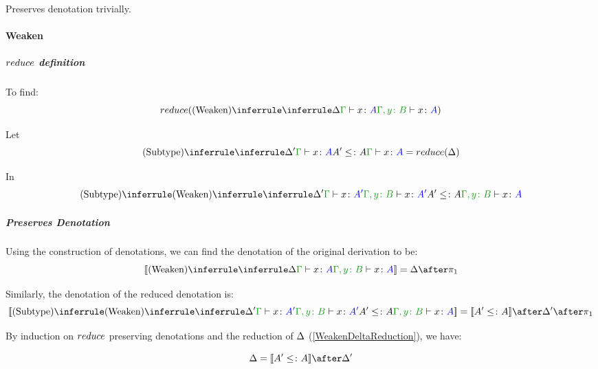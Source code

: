 \documentclass{report}
\begin{document}
        Preserves denotation trivially.

        \paragraph{Weaken}
        \subparagraph{$reduce$ definition}
        To find:
        \begin{equation}
            \reduce(\ntreeruleI{Weaken}{\treeruleI{\D}{\gtyperelation{x}{A}}}{\typerelation{\gby}{x}{A}})
        \end{equation}

        Let 
        \begin{equation}\label{WeakenDeltaReduction}
            \ntreeruleII{Subtype}{\treeruleI{\D'}{\gtyperelation{x}{A}}}{ A'\subtype A}{\gtyperelation{x}{A}} = \reduce(\D)
        \end{equation}

        In 
        \begin{equation}
            \ntreeruleII{Subtype}{
            \ntreeruleI{Weaken}{
                \treeruleI{\D'}{\gtyperelation{x}{A'}}
            } {
                \typerelation{\gby}{x}{A'}
            }
            }{
            A' \subtype A
            }{\typerelation{\gby}{x}{A}}
        \end{equation}

        \subparagraph{Preserves Denotation}
        Using the construction of denotations, we can find the denotation of the original derivation to be:
        \begin{equation}
            \deno{\ntreeruleI{Weaken}{\treeruleI{\D}{\gtyperelation{x}{A}}}{\typerelation{\gby}{x}{A}}} = \D \after \p
        \end{equation}

        Similarly, the denotation of the reduced denotation is:
        \begin{equation}
            \deno{\ntreeruleII{Subtype}{
                \ntreeruleI{Weaken}{
                    \treeruleI{\D'}{\gtyperelation{x}{A'}}
                } {
                    \typerelation{\gby}{x}{A'}
                }
                }{
                A' \subtype A
                }{\typerelation{\gby}{x}{A}}} = \deno{A'\subtype A}\after \D' \after \p
        \end{equation}


        By induction on $reduce$ preserving denotations and the reduction of $\Delta$ (\ref{WeakenDeltaReduction}), we have:

        \begin{equation}
            \D = \deno{A' \subtype A}\after\D'
        \end{equation}
\end{document}
